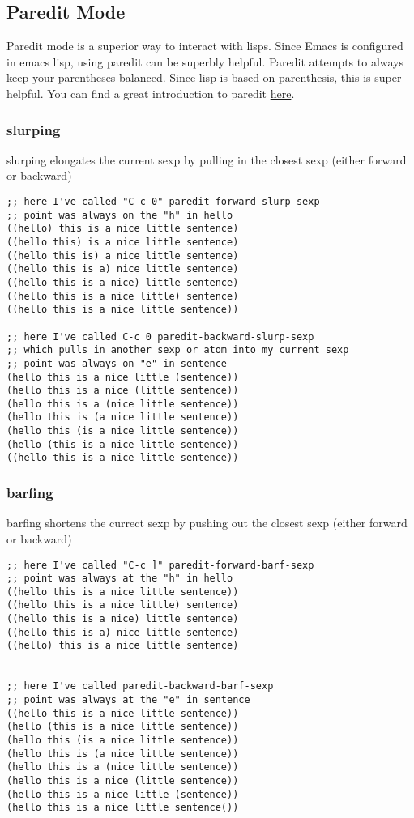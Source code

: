 \documentclass[11pt]{article}
\begin{document}
\subsection{Paredit Mode}
\label{sec:orgheadline33}
Paredit mode is a superior way to interact with lisps.  Since Emacs is configured in emacs lisp, using paredit can be superbly helpful.  Paredit attempts to always keep your parentheses balanced.  Since lisp is based on parenthesis, this is super helpful.  You can find a great introduction to paredit \href{http://danmidwood.com/content/2014/11/21/animated-paredit.html}{here}.

\subsubsection{slurping}
\label{sec:orgheadline30}

slurping elongates the current sexp by pulling in the closest sexp (either forward or backward)

\begin{verbatim}
;; here I've called "C-c 0" paredit-forward-slurp-sexp
;; point was always on the "h" in hello
((hello) this is a nice little sentence)
((hello this) is a nice little sentence)
((hello this is) a nice little sentence)
((hello this is a) nice little sentence)
((hello this is a nice) little sentence)
((hello this is a nice little) sentence)
((hello this is a nice little sentence))

;; here I've called C-c 0 paredit-backward-slurp-sexp
;; which pulls in another sexp or atom into my current sexp
;; point was always on "e" in sentence
(hello this is a nice little (sentence))
(hello this is a nice (little sentence))
(hello this is a (nice little sentence))
(hello this is (a nice little sentence))
(hello this (is a nice little sentence))
(hello (this is a nice little sentence))
((hello this is a nice little sentence))
\end{verbatim}

\subsubsection{barfing}
\label{sec:orgheadline31}

barfing shortens the currect sexp by pushing out the closest sexp (either forward or backward)
\begin{verbatim}
;; here I've called "C-c ]" paredit-forward-barf-sexp
;; point was always at the "h" in hello
((hello this is a nice little sentence))
((hello this is a nice little) sentence)
((hello this is a nice) little sentence)
((hello this is a) nice little sentence)
((hello) this is a nice little sentence)


;; here I've called paredit-backward-barf-sexp
;; point was always at the "e" in sentence
((hello this is a nice little sentence))
(hello (this is a nice little sentence))
(hello this (is a nice little sentence))
(hello this is (a nice little sentence))
(hello this is a (nice little sentence))
(hello this is a nice (little sentence))
(hello this is a nice little (sentence))
(hello this is a nice little sentence())
\end{verbatim}
\end{document}
